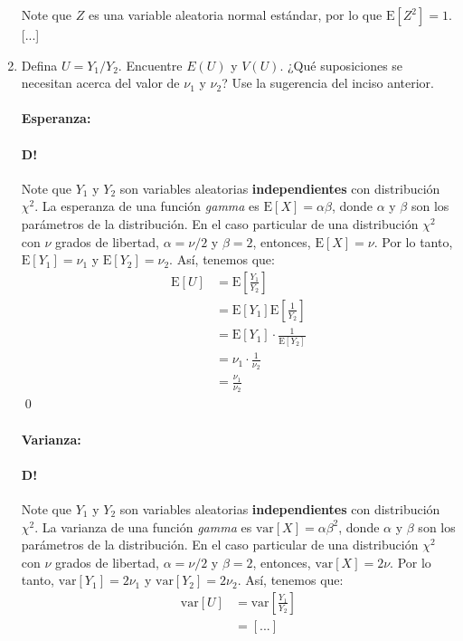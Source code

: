 \documentclass[8pt]{article}
\begin{document}
\begin{enumerate}
    Note que $Z$ es una variable aleatoria normal estándar, por lo que $\text{E}\left[Z^2\right] = 1$. [...]

    \item Defina $U = Y_1/Y_2$. Encuentre $E(U)$ y $V(U)$. ¿Qué suposiciones se necesitan acerca del valor de $\nu_1$ y $\nu_2$? Use la sugerencia del inciso anterior.
\paragraph{Esperanza:}
\paragraph*{D!} Note que $Y_1$ y $Y_2$ son variables aleatorias \textbf{independientes} con distribución $\chi^2$. La esperanza de una función \textit{gamma} es $\text{E}[X] = \alpha\beta$, donde $\alpha$ y $\beta$ son los parámetros de la distribución. En el caso particular de una distribución $\chi^2$ con $\nu$ grados de libertad, $\alpha = \nu / 2$ y $\beta = 2$, entonces, $\text{E}[X] = \nu$. Por lo tanto, $\text{E}[Y_1] = \nu_1$ y $\text{E}[Y_2] = \nu_2$. Así, tenemos que:
    \begin{align*}
        \text{E}[U] &= \text{E}\left[\frac{Y_1}{Y_2}\right] \\
        &= \text{E}\left[Y_1\right]\text{E}\left[\frac{1}{Y_2}\right] \\
        &= \text{E}\left[Y_1\right]\cdot\frac{1}{\text{E}\left[Y_2\right]} \\
        &= \nu_1 \cdot \frac{1}{\nu_2} \\
        &= \frac{\nu_1}{\nu_2}
    \end{align*}\qed

\paragraph{Varianza:}
\paragraph*{D!} Note que $Y_1$ y $Y_2$ son variables aleatorias \textbf{independientes} con distribución $\chi^2$. La varianza de una función \textit{gamma} es $\text{var}[X] = \alpha\beta^2$, donde $\alpha$ y $\beta$ son los parámetros de la distribución. En el caso particular de una distribución $\chi^2$ con $\nu$ grados de libertad, $\alpha = \nu / 2$ y $\beta = 2$, entonces, $\text{var}[X] = 2\nu$. Por lo tanto, $\text{var}[Y_1] = 2\nu_1$ y $\text{var}[Y_2] = 2\nu_2$. Así, tenemos que:
    \begin{align*}
        \text{var}[U] &= \text{var}\left[\frac{Y_1}{Y_2}\right] \\
            &= [...]
    \end{align*}

\end{enumerate}
\end{document}
